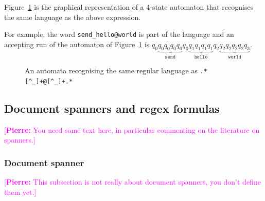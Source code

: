 \documentclass[12px]{article}
\theoremstyle{definition}
\newcommand{\pierre}[1]{\textcolor{magenta}{[\textbf{Pierre:} #1]}}
\begin{document}
        Figure~\ref{fig:automata_simple} is the graphical representation
        of a 4-state automaton that recognises the same language as the above
        expression.

        For example, the word \texttt{send\_hello@world} is part of the
        language and an accepting run of the automaton of
        Figure~\ref{fig:automata_simple} is $q_0 \underbrace{q_0 q_0 q_0
        q_0}_\texttt{send} q_0 \underbrace{q_1q_1q_1q_1}_\texttt{hello} q_2
        \underbrace{q_2 q_2 q_2 q_2 q_3}_\texttt{world}$.

        \begin{figure}[ht]
          \centering
          \caption{%
            An automata recognising the same regular language as
            \texttt{.*[\textasciicircum\_]+@[\textasciicircum\_]+.*}
          }%
          \label{fig:automata_simple}
        \end{figure}

    \subsection{Document spanners and regex formulas}

    \pierre{You need some text here, in particular commenting on the
    literature on spanners.}

      \subsubsection{Document spanner}

      \pierre{This subsection is not really about document spanners, you
      don't define them yet.}
\end{document}
